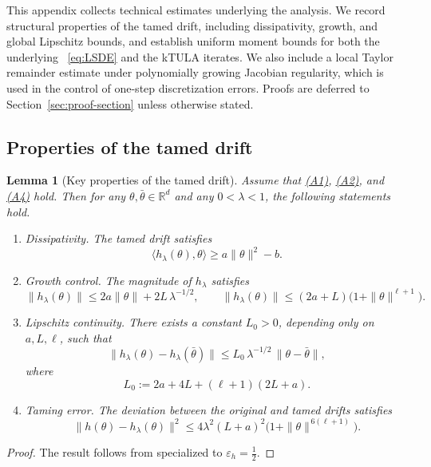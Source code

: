 \documentclass[11pt,a4paper,reqno]{amsart}
\theoremstyle{plain}
\newtheorem{lemma}{Lemma}
\theoremstyle{definition}
\theoremstyle{remark}
\begin{document}
This appendix collects technical estimates underlying the analysis. We record
structural properties of the tamed drift, including dissipativity, growth, and
global Lipschitz bounds, and establish uniform moment bounds for both the
underlying ~\ref{eq:LSDE} and the kTULA iterates. We also include a local
Taylor remainder estimate under polynomially growing Jacobian regularity, which
is used in the control of one-step discretization errors. Proofs are deferred
to Section~\ref{sec:proof-section} unless otherwise stated.


\subsection{Properties of the tamed drift}
\begin{lemma}[Key properties of the tamed drift]\label{lem:properties-hlambda}
Assume that \hyperref[ass:PJG]{\textnormal{(A1)}}, \hyperref[ass:PLC]{\textnormal{(A2)}},
and \hyperref[ass:D]{\textnormal{(A4)}} hold.
Then for any $\theta,\bar\theta\in\mathbb{R}^d$ and any $0<\lambda<1$, the following statements hold.
\begin{enumerate}
\item\label{it:hlam-dissipativity}
\emph{Dissipativity.}
The tamed drift satisfies
\[
  \langle h_\lambda(\theta),\theta\rangle
  \ge
  a\|\theta\|^2 - b .
\]

\item\label{it:hlam-growth}
\emph{Growth control.}
The magnitude of $h_\lambda$ satisfies
\[
\|h_\lambda(\theta)\|
\le
2a\|\theta\| + 2L\,\lambda^{-1/2},
\qquad
\|h_\lambda(\theta)\|
\le
(2a+L)\bigl(1+\|\theta\|^{\ell+1}\bigr).
\]

\item\label{it:hlam-lipschitz}
\emph{Lipschitz continuity.}
There exists a constant $L_0>0$, depending only on
$a,L,\ell$, such that
\[
\|h_\lambda(\theta)-h_\lambda(\bar\theta)\|
\le
L_0\,\lambda^{-1/2}\,\|\theta-\bar\theta\|,
\]
where
\[
L_0 := 2a + 4L + (\ell+1)(2L+a).
\]

\item\label{it:hlam-taming-error}
\emph{Taming error.}
The deviation between the original and tamed drifts satisfies
\[
  \|h(\theta)-h_\lambda(\theta)\|^2
  \le
  4\lambda^2 (L+a)^2
  \bigl(1+\|\theta\|^{\,6(\ell+1)}\bigr).
\]
\end{enumerate}
\end{lemma}

\begin{proof}
The result follows from \cite[Lemma 4.1]{lytras2025ktula} specialized to $\varepsilon_h = \frac{1}{2}$.
\end{proof}
\end{document}
